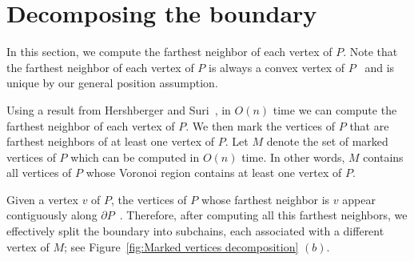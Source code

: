 \documentclass[a4paper,UKenglish]{lipics}
\begin{document}
\section{Decomposing the boundary}\label{Section:Decomposing the boundary}
In this section, we compute the farthest neighbor of each vertex of $P$. 
Note that the farthest neighbor of each vertex of $P$ is always a convex vertex of $P$~\cite{at-cgcsp-85} and is unique by our general position assumption.

Using a result from Hershberger and Suri~\cite{hershberger1993matrix}, in $O(n)$ time we can compute the farthest neighbor of each vertex of $P$.
We then mark the vertices of $P$ that are farthest neighbors of at least one vertex of $P$.
Let $M$ denote the set of marked vertices of $P$ which can be computed in $O(n)$ time.
In other words, $M$ contains all vertices of $P$ whose Voronoi region contains at least one vertex of $P$.

Given a vertex $v$ of $P$, the vertices of $P$ whose farthest neighbor is $v$ appear contiguously along $\partial P$~\cite{aronov1993furthest}. Therefore, after computing all this farthest neighbors, we effectively split the boundary into subchains, each associated with a different vertex of $M$; see Figure~\ref{fig:Marked vertices decomposition} $(b)$.
\end{document}
